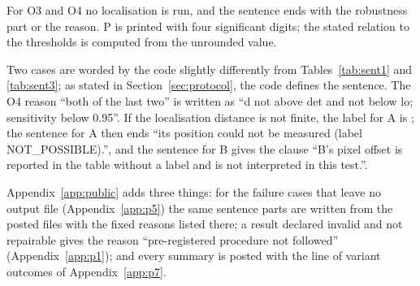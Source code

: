For O3 and O4 no localisation is run, and the sentence ends with the robustness part or the reason. P is printed with
four significant digits; the stated relation to the thresholds is computed from the unrounded value.

Two cases are worded by the code slightly differently from Tables~\ref{tab:sent1} and \ref{tab:sent3}; as stated in
Section~\ref{sec:protocol}, the code defines the sentence. The O4 reason ``both of the last two'' is written as ``d not
above det and not below lo; sensitivity below 0.95''. If the localisation distance is not finite, the label for A
is ; the sentence for A then ends ``its position could not be measured (label NOT\_POSSIBLE).'',
and the sentence for B gives the clause ``B's pixel offset is reported in the table without a label and is not
interpreted in this test.''.

Appendix~\ref{app:public} adds three things: for the failure cases that leave no output file (Appendix~\ref{app:p5}) the
same sentence parts are written from the posted files with the fixed reasons listed there; a result declared invalid
and not repairable gives the reason ``pre-registered procedure not followed'' (Appendix~\ref{app:p1}); and every summary
is posted with the line of variant outcomes of Appendix~\ref{app:p7}.
